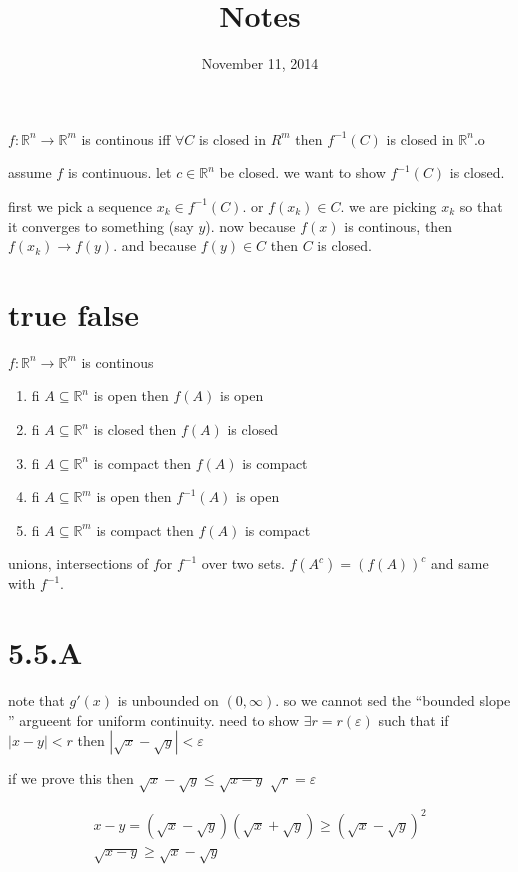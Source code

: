 \documentclass[letterpaper]{article}
\begin{document}
\title{Notes}
\date{November 11, 2014}
\maketitle
$f:\mathbb{R}^n\to\mathbb{R}^m$ is continous iff $\forall C$ is closed in $R^{m}$ then $f^{-1}(C)$ is closed in $\mathbb{R}^n$.o

assume $f$ is continuous. let $c\in \mathbb{R}^n$ be closed. we want to show $f^{-1}(C)$ is closed.

first we pick a sequence $x_k\in f^{-1}(C)$. or $f(x_k)\in C$. we are picking $x_k$ so that it converges to something (say $y$). now because $f(x)$ is continous, then $f(x_k)\to f(y)$. and because $f(y)\in C$ then $C$ is closed.

\section*{true false}
$f:\mathbb{R}^n\to\mathbb{R}^m$ is continous
\begin{enumerate}
\item
fi $A\subseteq \mathbb{R}^n$ is open then $f(A)$ is open
\item
fi $A\subseteq \mathbb{R}^n$ is closed then $f(A)$ is closed
\item
fi $A\subseteq \mathbb{R}^n$ is compact then $f(A)$ is compact
\item
fi $A\subseteq \mathbb{R}^m$ is open then $f^{-1}(A)$ is open
\item
fi $A\subseteq \mathbb{R}^m$ is compact then $f(A)$ is compact
\end{enumerate}

unions, intersections of $f$or $f^{-1}$ over two sets. $f(A^{c})=(f(A))^{c}$ and same with $f^{-1}$.

\section*{5.5.A}
note that $g'(x)$ is unbounded on $(0,\infty)$. so we cannot sed the ``bounded slope '' argueent for uniform continuity. need to show $\exists r=r(\varepsilon)$ such that if $|x-y|<r$ then $|\sqrt{x}-\sqrt{y}|<\varepsilon$

if we prove this then $\sqrt{x}-\sqrt{y}\le \sqrt{x-y}$ $\sqrt{r}=\varepsilon$

\begin{align*}
  x-y=(\sqrt{x}-\sqrt{y})(\sqrt{x}+\sqrt{y})\ge (\sqrt{x}-\sqrt{y})^2\\
  \sqrt{x-y}\ge \sqrt{x}-\sqrt{y}
\end{align*}
\end{document}
